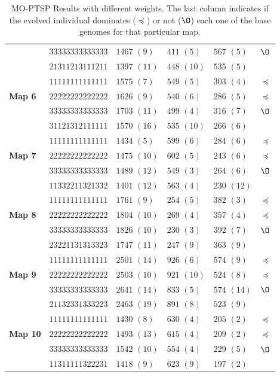 \documentclass[journal]{IEEEtran}
\begin{document}
\begin{table}[!t]
\begin{center}
\begin{tabular}{|p{0.8cm}|p{1.95cm}|m{1.2cm}|m{1.05cm}|m{1.05cm}|m{0.1cm}|}
 & $33333333333333$ & $1467$ $(9)$ & $411$ $(5)$ & $567$ $(5)$ & $\O$ \\
 & $21311213111211$ & $1397$ $(11)$ & $448$ $(10)$ & $535$ $(5)$ & \\
\hline
 \multirow{3}{*}{\textbf{Map 6}} & $11111111111111$ & $1575$ $(7)$ & $549$ $(5)$& $303$ $(4)$ & $\preceq$ \\
 & $22222222222222$ & $1626$ $(9)$ & $540$ $(6)$ & $286$ $(5)$ & $\preceq$ \\
 & $33333333333333$ & $1703$ $(11)$ & $499$ $(4)$ & $316$ $(7)$ & $\O$ \\
 & $31121312111111$ & $1570$ $(16)$ & $535$ $(10)$ & $266$ $(6)$ & \\
\hline
 \multirow{3}{*}{\textbf{Map 7}} & $11111111111111$ & $1434$ $(5)$ & $599$ $(6)$& $284$ $(6)$ & $\preceq$ \\
 & $22222222222222$ & $1475$ $(10)$ & $602$ $(5)$ & $243$ $(6)$ & $\preceq$ \\
 & $33333333333333$ & $1489$ $(12)$ & $549$ $(3)$ & $264$ $(6)$ & $\O$ \\
 & $11332211321332$ & $1401$ $(12)$ & $563$ $(4)$ & $230$ $(12)$ & \\
\hline
 \multirow{3}{*}{\textbf{Map 8}} & $11111111111111$ & $1761$ $(9)$ & $254$ $(5)$& $382$ $(3)$ & $\preceq$ \\
 & $22222222222222$ & $1804$ $(10)$ & $269$ $(4)$ & $357$ $(4)$ & $\preceq$ \\
 & $33333333333333$ & $1826$ $(10)$ & $230$ $(3)$ & $392$ $(7)$ & $\O$ \\
 & $23221131313323$ & $1747$ $(11)$ & $247$ $(9)$ & $363$ $(9)$ & \\
\hline
 \multirow{3}{*}{\textbf{Map 9}} & $11111111111111$ & $2501$ $(14)$ & $926$ $(6)$& $574$ $(9)$ & $\preceq$ \\
 & $22222222222222$ & $2503$ $(10)$ & $921$ $(10)$ & $524$ $(8)$ & $\preceq$ \\
 & $33333333333333$ & $2641$ $(14)$ & $833$ $(5)$ & $574$ $(14)$ & $\O$ \\
 & $21132331333223$ & $2463$ $(19)$ & $891$ $(8)$ & $523$ $(9)$ & \\
\hline
 \multirow{3}{*}{\textbf{Map 10}} & $11111111111111$ & $1430$ $(8)$ & $630$ $(4)$& $205$ $(2)$ & $\preceq$ \\
 & $22222222222222$ & $1493$ $(13)$ & $615$ $(4)$ & $209$ $(2)$ & $\preceq$ \\
 & $33333333333333$ & $1542$ $(10)$ & $554$ $(4)$ & $229$ $(5)$ & $\O$ \\
 & $11311111322231$ & $1418$ $(9)$ & $623$ $(9)$ & $197$ $(2)$ & \\
\hline
\end{tabular}
\caption{MO-PTSP Results with different weights. The last column indicates if the evolved individual dominates ($\preceq$) or not ($\O$) each one of the base genomes for that particular map.}
\label{tab:resVarW}
\end{center}
\end{table}
\end{document}
